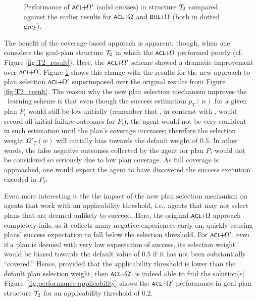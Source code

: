 \begin{figure}[t]
\begin{center}

\caption{Performance of $\CLSELB$ (solid crosses) in structure ${\mathcal{T}}_2$ compared against
the earlier results for $\CLSELA$ and $\BULSELA$ (both in dotted grey).}
\label{fig:T2_result2}
\end{center}
\end{figure}

The benefit of the coverage-based approach is apparent, though, when one
considers the goal-plan structure ${\mathcal{T}}_2$ in which the $\CLSELA$ performed
poorly (cf. Figure \ref{fig:T2_result}).
Here, the $\CLSELB$ scheme showed a dramatic improvement over $\CLSELA$. Figure
\ref{fig:T2_result2} shows this change with the results for the new approach to
plan selection $\CLSELB$ superimposed over the original results
from Figure \ref{fig:T2_result}.
The reason why the new plan selection mechanism improves the \CL\ learning scheme
is that even though the success estimation $p_T(w)$ for a given plan $P_i$ would
still be low initially (remember that \CL, in contrast with \BUL, would record
all initial failure outcomes for $P_i$), the agent would not be very confident in
such estimation until the plan's coverage increases; therefore the
selection weight $\Omega'_T(w)$ will initially bias towards the default weight of
$0.5$. In other words, the false negative outcomes collected by the agent for
plan $P_i$ would not be considered so seriously due to low plan coverage. As full
coverage is approached, one would expect the agent to have discovered the success
execution encoded in $P_i$.


Even more interesting is the the impact of the new plan selection mechanism on
agents that work with an applicability threshold, i.e., agents that may not
select plans that are deemed unlikely to succeed.
Here, the original $\CLSELA$ approach completely fails, as it collects many
negative experiences early on, quickly causing plans' success expectation to fall
below the selection threshold. For $\CLSELB$, even if a plan is deemed with very
low expectation of success, its selection weight would be biased towards the
default value of $0.5$ if it has not been substantially ``covered.''
Hence, provided that the applicability threshold is lower than the default plan
selection weight, then $\CLSELB$ is indeed able to find the solution(s).
Figure~\ref{fig:performance-applicability} shows the $\CLSELB$ performance in
goal-plan structure ${\mathcal{T}}_2$ for an applicability threshold of $0.2$.


